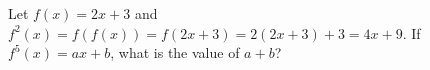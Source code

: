 Let $f(x)=2x+3$ and $f^2(x)=f(f(x))=f(2x+3)=2(2x+3)+3=4x+9$. If $f^5(x)=ax+b$, what is the value of $a+b$?
